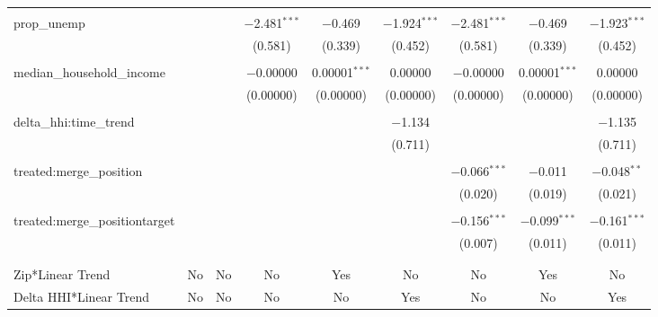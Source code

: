 \begin{table}[H]
{\begin{tabular}{@{\extracolsep{5pt}}lcccccccc}
   & & & & & & & & \\  

  prop\_unemp &  &  & $-$2.481$^{***}$ & $-$0.469 & $-$1.924$^{***}$ & $-$2.481$^{***}$ & $-$0.469 & $-$1.923$^{***}$ \\  

   &  &  & (0.581) & (0.339) & (0.452) & (0.581) & (0.339) & (0.452) \\  

   & & & & & & & & \\  

  median\_household\_income &  &  & $-$0.00000 & 0.00001$^{***}$ & 0.00000 & $-$0.00000 & 0.00001$^{***}$ & 0.00000 \\  

   &  &  & (0.00000) & (0.00000) & (0.00000) & (0.00000) & (0.00000) & (0.00000) \\  

   & & & & & & & & \\  

  delta\_hhi:time\_trend &  &  &  &  & $-$1.134 &  &  & $-$1.135 \\  

   &  &  &  &  & (0.711) &  &  & (0.711) \\  

   & & & & & & & & \\  

  treated:merge\_position &  &  &  &  &  & $-$0.066$^{***}$ & $-$0.011 & $-$0.048$^{**}$ \\  

   &  &  &  &  &  & (0.020) & (0.019) & (0.021) \\  

   & & & & & & & & \\  

  treated:merge\_positiontarget &  &  &  &  &  & $-$0.156$^{***}$ & $-$0.099$^{***}$ & $-$0.161$^{***}$ \\  

   &  &  &  &  &  & (0.007) & (0.011) & (0.011) \\  

   & & & & & & & & \\  

 \hline \\[-1.8ex]  

 Zip*Linear Trend & No & No & No & Yes & No & No & Yes & No \\  

 Delta HHI*Linear Trend & No & No & No & No & Yes & No & No & Yes \\  


\end{tabular}}
\end{table}
